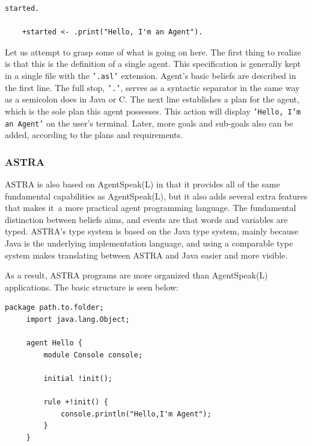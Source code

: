 \vspace{.5cm}

\begin{lstlisting}[backgroundcolor = \color{white}, frame=none, numbers=none]
    started.

    +started <- .print("Hello, I'm an Agent").
\end{lstlisting}

\vspace{.5cm}

Let us attempt to grasp some of what is going on here. The first thing to realize is that this is the definition of a single agent. This specification is generally kept in a single file with the \texttt{'.asl'} extension. Agent's basic beliefs are described in the first line. The full stop, \texttt{'.'}, serves as a syntactic separator in the same way as a semicolon does in Java or C. The next line establishes a plan for the agent, which is the sole plan this agent possesses. This action will display \texttt{'Hello, I'm an Agent'} on the user's terminal. Later, more goals and sub-goals also can be added, according to the plans and requirements.

\subsubsection{ASTRA}

ASTRA is also based on AgentSpeak(L) in that it provides all of the same fundamental capabilities as AgentSpeak(L), but it also adds several extra features that makes it a more practical agent programming language. The fundamental distinction between beliefs aims, and events are that words and variables are typed. ASTRA's type system is based on the Java type system, mainly because Java is the underlying implementation language, and using a comparable type system makes translating between ASTRA and Java easier and more visible.

\vspace{.5cm}
As a result, ASTRA programs are more organized than AgentSpeak(L) applications. The basic structure is seen below:

\vspace{.5cm}

\begin{lstlisting}[backgroundcolor = \color{white}, frame=none, numbers=none]
     package path.to.folder;
     import java.lang.Object;
     
     agent Hello {
         module Console console;
    
         initial !init();
    
         rule +!init() {
             console.println("Hello,I'm Agent");
         }
     }
\end{lstlisting}

